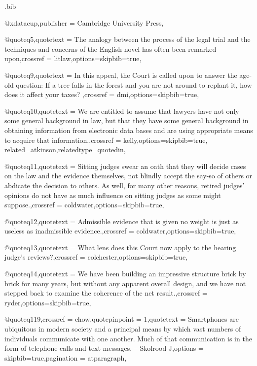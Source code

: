 \begin{filecontents*}[overwrite]{\jobname.bib}


@xdata{cup,publisher =  {Cambridge University Press},}

@quote{q5,quotetext =  {The analogy between the process of the legal trial and the techniques and concerns of the English novel has often been remarked upon},crossref =  {litlaw},options={skipbib=true},}

@quote{q9,quotetext =  { In this appeal, the Court is called upon to answer the age-old question:  If a tree falls in the forest and you are not around to replant it, how does it affect your taxes? },crossref =  {dmi},options={skipbib=true},}

@quote{q10,quotetext =  {We are entitled to assume that lawyers have not only some general background in law, but that they have some general background in obtaining information from electronic data bases and are using appropriate means to acquire that information.},crossref =  {kelly},options={skipbib=true}, related={atkinson},relatedtype={quotedin},}

@quote{q11,quotetext =  {Sitting judges swear an oath that they will decide cases on the law and the evidence themselves, not blindly accept the say-so of others or abdicate the decision to others. As well, for many other reasons, retired judges’ opinions do not have as much influence on sitting judges as some might suppose.},crossref =  {coldwater},options={skipbib=true},}

@quote{q12,quotetext =  {Admissible evidence that is given no weight is just as useless as inadmissible evidence.},crossref =  {coldwater},options={skipbib=true},}

@quote{q13,quotetext =  {What lens does this Court now apply to the hearing judge’s reviews?},crossref =  {colchester},options={skipbib=true},}

@quote{q14,quotetext =  {We have been building an impressive structure brick by brick for many years, but without any apparent overall design, and we have not stepped back to examine the coherence of the net result.},crossref =  {ryder},options={skipbib=true},}

@quote{q119,crossref = {chow},quotepinpoint = {1},quotetext = {Smartphones are ubiquitous in modern society and a principal means by which vast numbers of individuals communicate with one another. Much of that communication is in the form of telephone calls and text messages. – Skolrood J},options = {skipbib=true},pagination =  {atparagraph},
}


\end{filecontents*}
